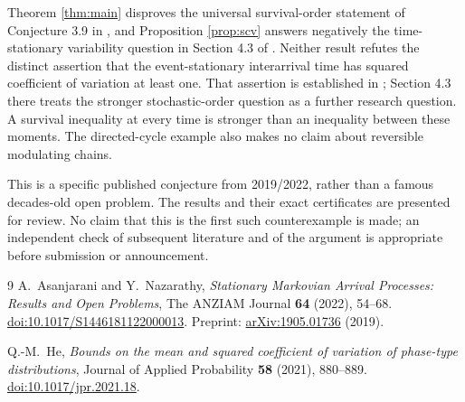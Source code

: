 \documentclass[11pt]{article}
\begin{document}
Theorem \ref{thm:main} disproves the universal survival-order statement
of Conjecture 3.9 in \cite{AN}, and Proposition \ref{prop:scv} answers
negatively the time-stationary variability question in Section 4.3 of
\cite{He}. Neither result refutes the distinct assertion that the
event-stationary interarrival time has squared coefficient of variation
at least one. That assertion is established in \cite{He}; Section 4.3
there treats the stronger stochastic-order question as a further
research question. A survival inequality at every time is stronger
than an inequality between these moments. The directed-cycle example
also makes no claim about reversible modulating chains.

This is a specific published conjecture from 2019/2022, rather than a
famous decades-old open problem. The results and their exact certificates
are presented for review. No claim that this is the first such
counterexample is made; an independent check of subsequent literature
and of the argument is appropriate before submission or announcement.

\begin{thebibliography}{9}
A.~Asanjarani and Y.~Nazarathy,
\emph{Stationary Markovian Arrival Processes: Results and Open Problems},
The ANZIAM Journal \textbf{64} (2022), 54--68.
\href{https://doi.org/10.1017/S1446181122000013}{doi:10.1017/S1446181122000013}.
Preprint: \href{https://arxiv.org/abs/1905.01736}{arXiv:1905.01736} (2019).

Q.-M.~He,
\emph{Bounds on the mean and squared coefficient of variation of
phase-type distributions},
Journal of Applied Probability \textbf{58} (2021), 880--889.
\href{https://doi.org/10.1017/jpr.2021.18}{doi:10.1017/jpr.2021.18}.
\end{thebibliography}
\end{document}
